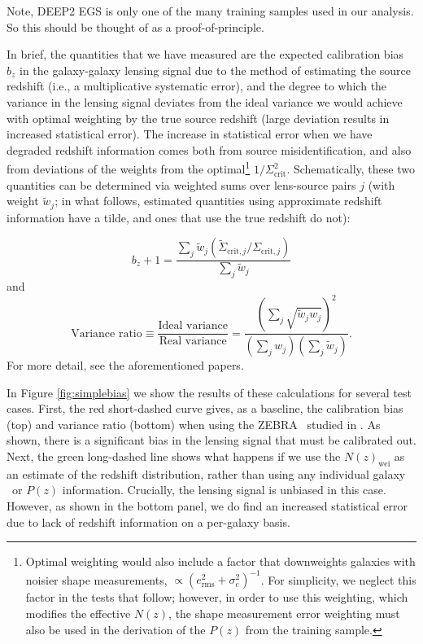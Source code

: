 \documentclass[preprint]{aastex}
\begin{document}
Note, DEEP2 EGS is only one of the many training samples used in our analysis.
So this should be thought of as a proof-of-principle.

In brief, the quantities that we have measured are the expected calibration
bias $b_z$ in the galaxy-galaxy lensing signal due to the method of estimating
the source redshift (i.e., a multiplicative systematic error), and the degree to
which the variance in the lensing signal deviates from the ideal variance we
would achieve with optimal weighting by the true source redshift (large
deviation results in increased statistical error).  The increase in statistical
error when we have degraded redshift information comes both from source
misidentification, and also from deviations of the weights from the
optimal\footnote{Optimal weighting would also include a factor that downweights
galaxies with noisier shape measurements, $\propto (e_\mathrm{rms}^2 +
\sigma_e^2)^{-1}$.  For simplicity, we neglect this factor in the tests that
follow; however, in order to use this weighting, which modifies the effective
$N(z)$, the shape measurement error weighting must also be used in the
derivation of the $P(z)$ from the training sample.} $1/\Sigma_\mathrm{crit}^2$.
Schematically, these two quantities can be determined via weighted sums over
lens-source pairs $j$ (with weight $\tilde{w}_j$; in what follows, estimated
quantities using approximate redshift information have a tilde, and ones that
use the true redshift do not):

\noindent
\begin{equation} \label{eq:lensbias}
b_z + 1 = \frac{\sum_j \tilde{w}_j (\tilde{\Sigma}_{\mathrm{crit},j}
   / \Sigma_{\mathrm{crit},j})}{\sum_j \tilde{w}_j}
\end{equation}
and
\begin{equation} \label{eq:lensweight}
\textrm{Variance ratio}  \equiv \frac{\textrm{Ideal variance}}{\textrm{Real
     variance}} = \frac{(\sum_j \sqrt{\tilde{w}_j w_j})^2}{(\sum_j
     w_j)(\sum_j \tilde{w}_j)}.
\end{equation}
For more detail, see the aforementioned papers.

In Figure \ref{fig:simplebias} we show the results of these calculations for
several test cases.  First, the red short-dashed curve gives, as a baseline,
the calibration bias (top) and variance ratio (bottom) when using the ZEBRA
\photoz\ studied in \citet{Nakajima11}.  As shown, there is a
significant bias in the lensing signal that must be calibrated out.
Next, the green long-dashed line shows what happens if we use the
$N(z)_\mathrm{wei}$ as an estimate of the redshift distribution, rather than
using any individual galaxy \photoz\ or $P(z)$ information.  Crucially, the
lensing signal is unbiased in this case. However, as shown in the bottom
panel, we do find an increased
statistical error due to lack of redshift information on a per-galaxy basis.
\end{document}
